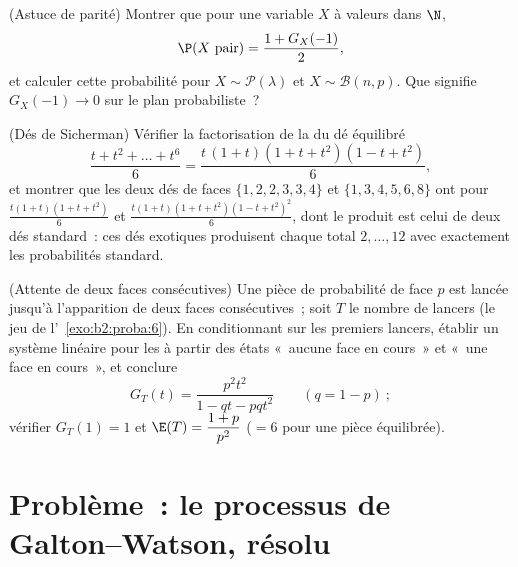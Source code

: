 \begin{exercise}[$\star$]\label{exo:b2:genfun:10}
(Astuce de parité) Montrer que pour une variable $X$ à valeurs dans
$\N$,
\[
\P(X \text{ pair}) = \frac{1 + G_X(-1)}{2} ,
\]
et calculer cette probabilité pour $X \sim \mathcal P(\lambda)$
et $X \sim \mathcal B(n, p)$. Que signifie $G_X(-1) \to 0$ sur le plan
probabiliste~?
\end{exercise}

\begin{exercise}[$\star\star$]\label{exo:b2:genfun:11}
(Dés de Sicherman) Vérifier la factorisation de la  du dé équilibré
\[
\frac{t + t^2 + \dots + t^6}{6}
= \frac{t\,(1 + t)(1 + t + t^2)(1 - t + t^2)}{6},
\]
et montrer que les deux dés de faces $\{1, 2, 2, 3, 3, 4\}$
et $\{1, 3, 4, 5, 6, 8\}$ ont pour 
$\frac{t(1+t)(1+t+t^2)}6$ et
$\frac{t(1+t)(1+t+t^2)(1-t+t^2)^2}6$, dont le produit est celui de
deux dés standard~: ces dés exotiques produisent chaque total $2,
\dots, 12$ avec exactement les probabilités standard.
\end{exercise}

\begin{exercise}[$\star\star\star$]\label{exo:b2:genfun:12}
(Attente de deux faces consécutives) Une pièce de probabilité de face
$p$ est lancée jusqu'à l'apparition de deux faces consécutives~; soit
$T$ le nombre de lancers (le jeu de l'~\cref{exo:b2:proba:6}).
En conditionnant sur les premiers lancers, établir un système linéaire
pour les  à partir des états «~aucune face en
cours~» et «~une face en cours~», et conclure
\[
G_T(t) = \frac{p^2t^2}{1 - qt - pqt^2}
\qquad (q = 1 - p)~;
\]
vérifier $G_T(1) = 1$ et $\E(T) = \dfrac{1 + p}{p^2}$ ($= 6$
pour une pièce équilibrée).
\end{exercise}

\section{Problème~: le processus de Galton--Watson, résolu}

